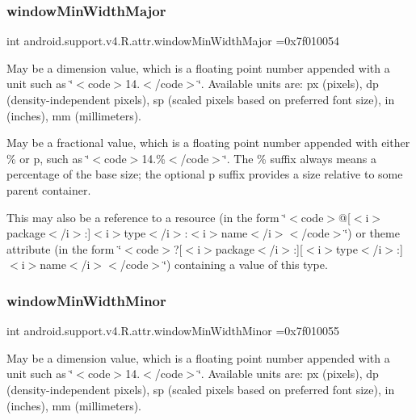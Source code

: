 \subsubsection{\texorpdfstring{window\+Min\+Width\+Major}{windowMinWidthMajor}}
{\footnotesize\ttfamily int android.\+support.\+v4.\+R.\+attr.\+window\+Min\+Width\+Major =0x7f010054\hspace{0.3cm}{\ttfamily [static]}}

May be a dimension value, which is a floating point number appended with a unit such as \char`\"{}$<$code$>$14.\+5sp$<$/code$>$\char`\"{}. Available units are\+: px (pixels), dp (density-\/independent pixels), sp (scaled pixels based on preferred font size), in (inches), mm (millimeters). 

May be a fractional value, which is a floating point number appended with either \% or p, such as \char`\"{}$<$code$>$14.\%$<$/code$>$\char`\"{}. The \% suffix always means a percentage of the base size; the optional p suffix provides a size relative to some parent container. 

This may also be a reference to a resource (in the form \char`\"{}$<$code$>$@\mbox{[}$<$i$>$package$<$/i$>$\+:\mbox{]}$<$i$>$type$<$/i$>$\+:$<$i$>$name$<$/i$>$$<$/code$>$\char`\"{}) or theme attribute (in the form \char`\"{}$<$code$>$?\mbox{[}$<$i$>$package$<$/i$>$\+:\mbox{]}\mbox{[}$<$i$>$type$<$/i$>$\+:\mbox{]}$<$i$>$name$<$/i$>$$<$/code$>$\char`\"{}) containing a value of this type. \mbox{\label{classandroid_1_1support_1_1v4_1_1R_1_1attr_a564927dd9bc70402dc96e92101cca431}} 
\subsubsection{\texorpdfstring{window\+Min\+Width\+Minor}{windowMinWidthMinor}}
{\footnotesize\ttfamily int android.\+support.\+v4.\+R.\+attr.\+window\+Min\+Width\+Minor =0x7f010055\hspace{0.3cm}{\ttfamily [static]}}

May be a dimension value, which is a floating point number appended with a unit such as \char`\"{}$<$code$>$14.\+5sp$<$/code$>$\char`\"{}. Available units are\+: px (pixels), dp (density-\/independent pixels), sp (scaled pixels based on preferred font size), in (inches), mm (millimeters). 

